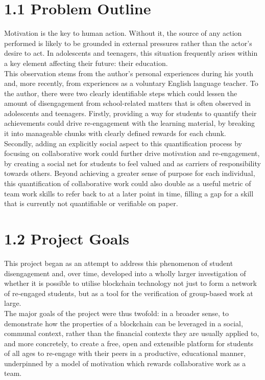 \section{1.1 Problem Outline}\label{problem-outline}

Motivation is the key to human action. Without it, the source of any
action performed is likely to be grounded in external pressures rather
than the actor's desire to act. In adolescents and teenagers, this
situation frequently arises within a key element affecting their future:
their education.\\
This observation stems from the author's personal experiences during his
youth and, more recently, from experiences as a voluntary English
language teacher. To the author, there were two clearly identifiable
steps which could lessen the amount of disengagement from school-related
matters that is often observed in adolescents and teenagers. Firstly,
providing a way for students to quantify their achievements could drive
re-engagement with the learning material, by breaking it into manageable
chunks with clearly defined rewards for each chunk.\\
Secondly, adding an explicitly social aspect to this quantification
process by focusing on collaborative work could further drive motivation
and re-engagement, by creating a social net for students to feel valued
and as carriers of responsibility towards others. Beyond achieving a
greater sense of purpose for each individual, this quantification of
collaborative work could also double as a useful metric of team work
skills to refer back to at a later point in time, filling a gap for a
skill that is currently not quantifiable or verifiable on paper.

\section{1.2 Project Goals}\label{project-goals}

This project began as an attempt to address this phenomenon of student
disengagement and, over time, developed into a wholly larger
investigation of whether it is possible to utilise blockchain technology
not just to form a network of re-engaged students, but as a tool for the
verification of group-based work at large.\\
The major goals of the project were thus twofold: in a broader sense, to
demonstrate how the properties of a blockchain can be leveraged in a
social, communal context, rather than the financial contexts they are
usually applied to, and more concretely, to create a free, open and
extensible platform for students of all ages to re-engage with their
peers in a productive, educational manner, underpinned by a model of
motivation which rewards collaborative work as a team.


